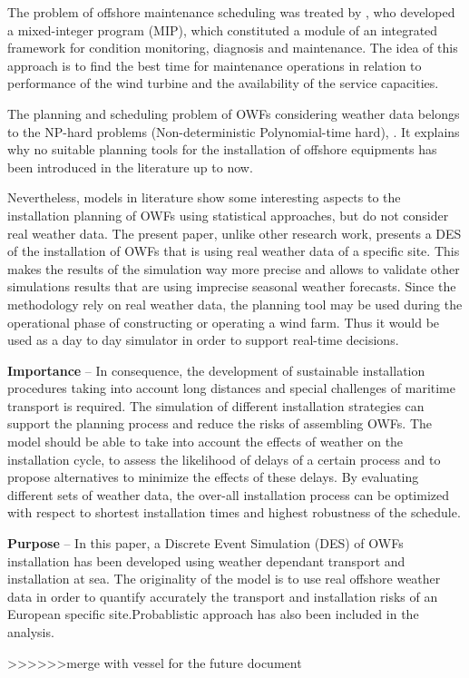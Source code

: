 The problem of offshore maintenance scheduling was treated by \cite{Kovacs2011497}, who developed a mixed-integer program (MIP), which constituted a module of an integrated framework for condition monitoring, diagnosis and maintenance. The idea of this approach is to find the best time for maintenance operations in relation to performance of the wind turbine and the availability of the service capacities.

The planning and scheduling problem of OWFs considering weather data belongs to the NP-hard problems (Non-deterministic Polynomial-time hard), \cite{leeuwen1990}. It explains why no suitable planning tools for the installation of offshore equipments has been introduced in the literature up to now. 

Nevertheless, models in literature show some interesting aspects to the installation planning of OWFs using statistical approaches, but do not consider real weather data. The present paper, unlike other research work, presents a DES of the installation of OWFs that is using real weather data of a specific site. This makes the results of the simulation way more precise and allows to validate other simulations results that are using imprecise seasonal weather forecasts. Since the methodology rely on real weather data, the planning tool may be used during the operational phase of constructing or operating a wind farm. Thus it would be used as a day to day simulator in order to support real-time decisions.

\textbf{Importance} --
In consequence, the development of sustainable installation procedures taking into account long distances and special challenges of maritime transport is required. The simulation of different installation strategies can support the planning process and reduce the risks of assembling OWFs. The model should be able to take into account the effects of weather on the installation cycle, to assess the likelihood of delays of a certain process and to propose alternatives to minimize the effects of these delays. By evaluating different sets of weather data, the over-all installation process can be optimized with respect to shortest installation times and highest robustness of the schedule.

\textbf{Purpose} --
In this paper, a Discrete Event Simulation (DES) of OWFs installation has been developed using weather dependant transport and installation at sea. The originality of the model is to use real offshore weather data in order to quantify accurately the transport and installation risks of an European specific site.Probablistic approach has also been included in the analysis.


>>>>>>merge with vessel for the future document